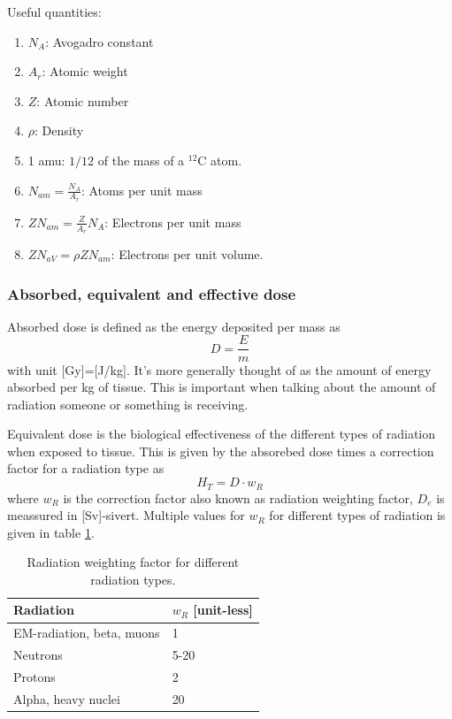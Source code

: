 \documentclass[jmp, amsmath, amssymb, reprint]{article}
\numberwithin{equation}{section}
\begin{document}
\begin{multicols}{2}
Useful quantities:
\begin{enumerate}
\item \(N_A\): Avogadro constant
\item \(A_r\): Atomic weight
\item \(Z\): Atomic number
\item \(\rho\): Density
\item 1 amu: \(1/12\) of the mass of a \(^{12}\)C atom.
\item \(N_{am}=\frac{N_A}{A_r}\): Atoms per unit mass
\item \(ZN_{am}=\frac{Z}{A_r}N_A\): Electrons per unit mass
\item \(ZN_{aV}=\rho ZN_{am}\): Electrons per unit volume.
\end{enumerate}

\subsubsection{Absorbed, equivalent and effective dose}

Absorbed dose is defined as the energy deposited per mass as
\begin{equation}
D=\frac{E}{m}
\end{equation}
with unit [Gy]=[J/kg]. It's more generally thought of as the amount of energy absorbed per kg of tissue. This is important when talking about the amount of radiation someone or something is receiving.

Equivalent dose is the biological effectiveness of the different types of radiation when exposed to tissue. This is given by the absorebed dose times a correction factor for a radiation type as
\begin{equation}
H_T = D\cdot w_R
\end{equation}
where \(w_R\) is the correction factor also known as radiation weighting factor, \(D_e\) is meassured in [Sv]-sivert. Multiple values for \(w_R\) for different types of radiation is given in table \ref{tabel:6}.

\begin{table}[H]
  \begin{center}
    \begin{tabular}{| l | l |}
   	\hline
	Radiation & \(w_R\) [unit-less]\\ \hline
	EM-radiation, beta, muons & 1\\
	Neutrons & 5-20\\
	Protons & 2\\
	Alpha, heavy nuclei & 20\\ \hline
	\end{tabular}
    \caption{Radiation weighting factor for different radiation types.}
    \label{tabel:6}
  \end{center}
\end{table}


\end{multicols}
\end{document}

